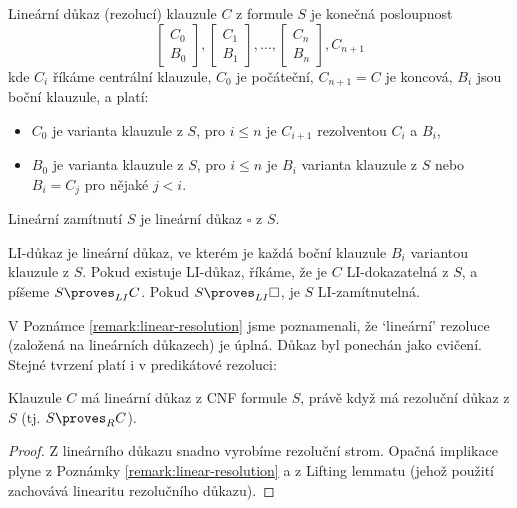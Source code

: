 \begin{definition}
    \alert{Lineární důkaz} (rezolucí) klauzule $C$ z formule $S$ je konečná posloupnost
    $$
    \begin{bmatrix}
        C_0 \\
        B_0
    \end{bmatrix},
    \begin{bmatrix}
        C_1 \\
        B_1
    \end{bmatrix},\dots,
    \begin{bmatrix}
        C_n \\
        B_n
    \end{bmatrix},
    C_{n+1}
    $$
    kde $C_i$ říkáme \alert{centrální} klauzule, $C_0$ je \alert{počáteční}, $C_{n+1}=C$ je \alert{koncová}, $B_i$ jsou \alert{boční} klauzule, a platí:
    \begin{itemize}
        \item $C_0$ je varianta klauzule z $S$, pro $i\leq n$ je $C_{i+1}$ rezolventou $C_i$ a $B_i$,
        \item $B_0$ je varianta klauzule z $S$, pro $i\leq n$ je $B_i$ varianta klauzule z $S$ nebo $B_i=C_j$ pro nějaké $j<i$. 
    \end{itemize}
    \alert{Lineární zamítnutí} $S$ je lineární důkaz $\square$ z $S$.
    
    \alert{LI-důkaz} je lineární důkaz, ve kterém je každá boční klauzule $B_i$ variantou klauzule z $S$. Pokud existuje LI-důkaz, říkáme, že je $C$ \alert{LI-dokazatelná} z $S$, a píšeme $S\proves_{LI}C$. Pokud $S\proves_{LI}\square$, je $S$ \alert{LI-zamítnutelná}.
\end{definition}

V Poznámce \ref{remark:linear-resolution} jsme poznamenali, že `lineární' rezoluce (založená na lineárních důkazech) je úplná. Důkaz byl ponechán jako cvičení. Stejné tvrzení platí i v predikátové rezoluci:

\begin{theorem}
Klauzule $C$ má lineární důkaz z CNF formule $S$, právě když má rezoluční důkaz z $S$ (tj. $S\proves_R C$).
\end{theorem}
\begin{proof}
Z lineárního důkazu snadno vyrobíme rezoluční strom. Opačná implikace plyne z Poznámky \ref{remark:linear-resolution} a z Lifting lemmatu (jehož použití zachovává linearitu rezolučního důkazu).
\end{proof}

